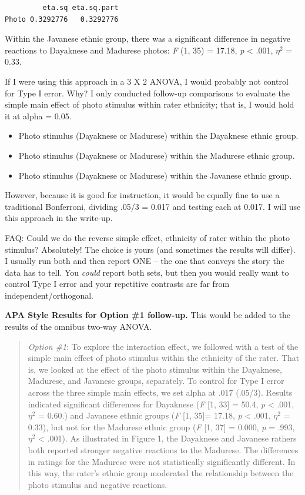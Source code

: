 \documentclass[
  11pt,
]{book}
\providecommand{\tightlist}{%
  \setlength{\itemsep}{0pt}\setlength{\parskip}{0pt}}
\begin{document}
\begin{verbatim}
         eta.sq eta.sq.part
Photo 0.3292776   0.3292776
\end{verbatim}

Within the Javanese ethnic group, there was a significant difference in negative reactions to Dayaknese and Madurese photos: \emph{F} (1, 35) = 17.18, \emph{p} \textless{} .001, \(\eta ^{2}\) = 0.33.

If I were using this approach in a 3 X 2 ANOVA, I would probably not control for Type I error. Why? I only conducted follow-up comparisons to evaluate the simple main effect of photo stimulus within rater ethnicity; that is, I would hold it at alpha = 0.05.

\begin{itemize}
\tightlist
\item
  Photo stimulus (Dayaknese or Madurese) within the Dayaknese ethnic group.
\item
  Photo stimulus (Dayaknese or Madurese) within the Madurese ethnic group.
\item
  Photo stimulus (Dayaknese or Madurese) within the Javanese ethnic group.
\end{itemize}

However, because it is good for instruction, it would be equally fine to use a traditional Bonferroni, dividing .05/3 = 0.017 and testing each at 0.017. I will use this approach in the write-up.

FAQ: Could we do the reverse simple effect, ethnicity of rater within the photo stimulus? Absolutely! The choice is yours (and sometimes the results will differ). I usually run both and then report ONE -- the one that conveys the story the data has to tell. You \emph{could} report both sets, but then you would really want to control Type I error and your repetitive contrasts are far from independent/orthogonal.

\textbf{APA Style Results for Option \#1 follow-up.} This would be added to the results of the omnibus two-way ANOVA.

\begin{quote}
\emph{Option \#1}: To explore the interaction effect, we followed with a test of the simple main effect of photo stimulus within the ethnicity of the rater. That is, we looked at the effect of the photo stimulus within the Dayaknese, Madurese, and Javanese groups, separately. To control for Type I error across the three simple main effects, we set alpha at .017 (.05/3). Results indicated significant differences for Dayaknese (\emph{F} {[}1, 33{]} = 50.4, \emph{p} \textless{} .001, \(\eta ^{2}\) = 0.60.) and Javanese ethnic groups (\emph{F} {[}1, 35{]}= 17.18, \emph{p} \textless{} .001, \(\eta ^{2}\) = 0.33), but not for the Madurese ethnic group (\emph{F} {[}1, 37{]} = 0.000, \emph{p} = .993, \(\eta ^{2}\) \textless{} .001). As illustrated in Figure 1, the Dayaknese and Javanese rathers both reported stronger negative reactions to the Madurese. The differences in ratings for the Madurese were not statistically significantly different. In this way, the rater's ethnic group moderated the relationship between the photo stimulus and negative reactions.
\end{quote}
\end{document}
